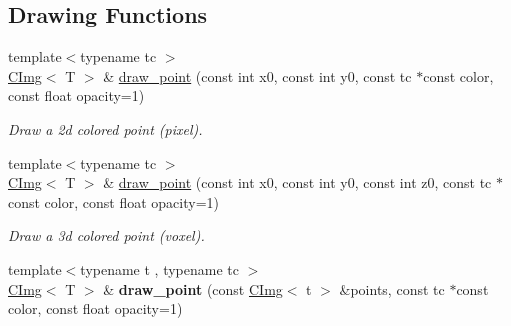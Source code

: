 \subsection*{Drawing Functions}
\label{_amgrpe88ada7738258a9eae71b44ed37b6e5c}
 \begin{DoxyCompactItemize}
\item 
{\footnotesize template$<$typename tc $>$ }\\\hyperlink{structcimg__library_1_1CImg}{CImg}$<$ T $>$ \& \hyperlink{structcimg__library_1_1CImg_a07751cdf418fc2120b971bc0f7e0da8c}{draw\_\-point} (const int x0, const int y0, const tc $\ast$const color, const float opacity=1)
\begin{DoxyCompactList}\small\item\em Draw a 2d colored point (pixel). \item\end{DoxyCompactList}\item 
\hypertarget{structcimg__library_1_1CImg_aa852838a5f54966b700093f45d60330f}{
{\footnotesize template$<$typename tc $>$ }\\\hyperlink{structcimg__library_1_1CImg}{CImg}$<$ T $>$ \& \hyperlink{structcimg__library_1_1CImg_aa852838a5f54966b700093f45d60330f}{draw\_\-point} (const int x0, const int y0, const int z0, const tc $\ast$const color, const float opacity=1)}
\label{structcimg__library_1_1CImg_aa852838a5f54966b700093f45d60330f}

\begin{DoxyCompactList}\small\item\em Draw a 3d colored point (voxel). \item\end{DoxyCompactList}\item 
\hypertarget{structcimg__library_1_1CImg_a52c224fa79b1d5ab1c1e8d619c8944b3}{
{\footnotesize template$<$typename t , typename tc $>$ }\\\hyperlink{structcimg__library_1_1CImg}{CImg}$<$ T $>$ \& {\bfseries draw\_\-point} (const \hyperlink{structcimg__library_1_1CImg}{CImg}$<$ t $>$ \&points, const tc $\ast$const color, const float opacity=1)}
\label{structcimg__library_1_1CImg_a52c224fa79b1d5ab1c1e8d619c8944b3}


\end{DoxyCompactItemize}
